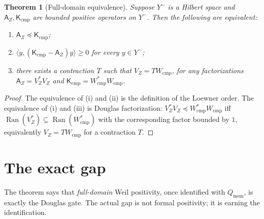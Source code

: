 \documentclass[11pt]{article}
\newtheorem{theorem}{Theorem}
\newcommand{\AZ}{\mathsf A_Z}
\newcommand{\Kcmp}{\mathsf K_{\mathrm{cmp}}}
\newcommand{\Yminus}{Y^-}
\begin{document}
\begin{theorem}[Full-domain equivalence]
Suppose \(\Yminus\) is a Hilbert space and \(\AZ,\Kcmp\) are bounded positive
operators on \(\Yminus\).  Then the following are equivalent:
\begin{enumerate}[label=(\roman*)]
\item \( \AZ\preceq \Kcmp\);
\item \( \langle y,(\Kcmp-\AZ)y\rangle\ge0\) for every \(y\in\Yminus\);
\item there exists a contraction \(T\) such that \(V_Z=T W_{\mathrm{cmp}}\),
      for any factorizations \(\AZ=V_Z^*V_Z\) and \(\Kcmp=W_{\mathrm{cmp}}^*W_{\mathrm{cmp}}\).
\end{enumerate}
\end{theorem}

\begin{proof}
The equivalence of (i) and (ii) is the definition of the Loewner order.
The equivalence of (i) and (iii) is Douglas factorization: \(V_Z^*V_Z\preceq
W_{\mathrm{cmp}}^*W_{\mathrm{cmp}}\) iff
\(\operatorname{Ran}(V_Z^*)\subseteq\operatorname{Ran}(W_{\mathrm{cmp}}^*)\)
with the corresponding factor bounded by \(1\), equivalently \(V_Z=T
W_{\mathrm{cmp}}\) for a contraction \(T\).
\end{proof}

\section{The exact gap}

The theorem says that \emph{full-domain} Weil positivity, once identified with
\(Q_{\mathrm{mem}}\), is exactly the Douglas gate.  The actual gap is not formal
positivity; it is earning the identification.
\end{document}
